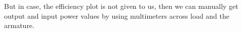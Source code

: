 \documentclass[12pt]{article}
\begin{document}
    But in case, the efficiency plot is not given to us, then we can manually get output and input power values by using multimeters across load and the armature.
    
    \vspace{0.1cm}\\
    
    
    
\end{document}
